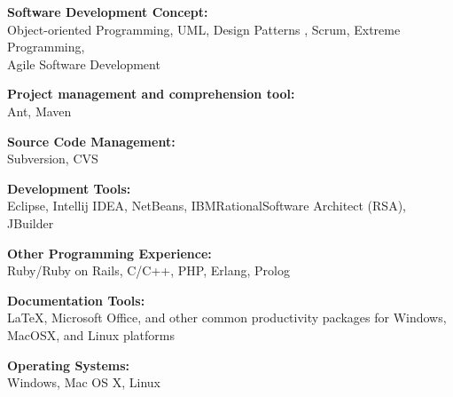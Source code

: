 \documentclass[10pt]{article}
\newcommand{\blankline}{\quad\pagebreak[2]}
\begin{document}
\blankline

{\textbf{Software Development Concept:}}\\
Object-oriented Programming, UML, Design \nolinebreak Patterns
, Scrum, Extreme Programming,\\ Agile Software Development

\blankline

{\textbf{Project management and comprehension tool:}}\\
Ant, Maven

\blankline

{\textbf{Source Code Management:}}\\
Subversion, CVS

\blankline

{\textbf{Development Tools:}}\\
Eclipse, Intellij IDEA, NetBeans, IBM\circledR\space Rational\circledR\space Software Architect (RSA), JBuilder

\blankline

{\textbf{Other Programming Experience:}}\\
Ruby/Ruby on Rails, C/C++, PHP, Erlang, Prolog

\blankline

{\textbf{Documentation Tools:}}\\ 
\LaTeX{}, Microsoft Office,
and other common productivity packages for Windows,\\  Mac\nolinebreak OS\nolinebreak X, and
Linux platforms

\blankline

{\textbf{Operating Systems:}}\\
Windows, Mac OS X, Linux

\newpage
\end{document}
